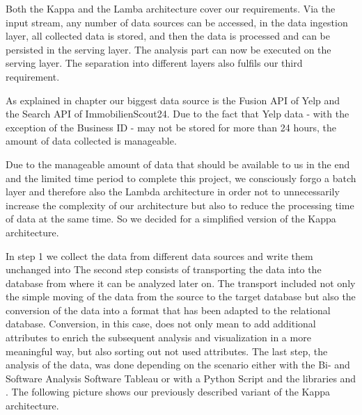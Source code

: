 Both the Kappa and the Lamba architecture cover our requirements.
Via the input stream, any number of data sources can be accessed, in the
data ingestion layer, all collected data is stored, and then the data is processed and can be persisted in the serving layer.
The analysis part can now be executed on the serving layer.
The separation into different layers also fulfils our third requirement.

As explained in chapter  our biggest data source is the Fusion \ac{API} of Yelp and
the Search \ac{API} of ImmobilienScout24.
Due to the fact that Yelp data - with the exception of the Business ID - may not be stored for more than 24 hours,\cite{YelpFaq}
the amount of data collected is manageable.

Due to the manageable amount of data that should be available to us in the end and the limited time period to complete this project,
we consciously forgo a batch layer and therefore also the Lambda architecture
in order not to unnecessarily increase the complexity of our architecture but also to reduce the processing time of data at the same time.
So we decided for a simplified version of the Kappa architecture.

In step 1 we collect the data from different data sources and write them unchanged into \gds{}
The second step consists of transporting the data into the \pg{} database from where it can be analyzed later on.
The transport included not only the simple moving of the data from the source to the target database but also the conversion of the data
into a format that has been adapted to the relational database.
Conversion, in this case, does not only mean to add additional attributes to enrich the subsequent analysis and visualization in a more meaningful way,
but also sorting out not used attributes.
The last step, the analysis of the data, was done depending on the scenario either with the Bi- and Software Analysis Software Tableau or with a Python Script and the libraries  and .
\newline
The following picture shows our previously described variant of the Kappa architecture.

